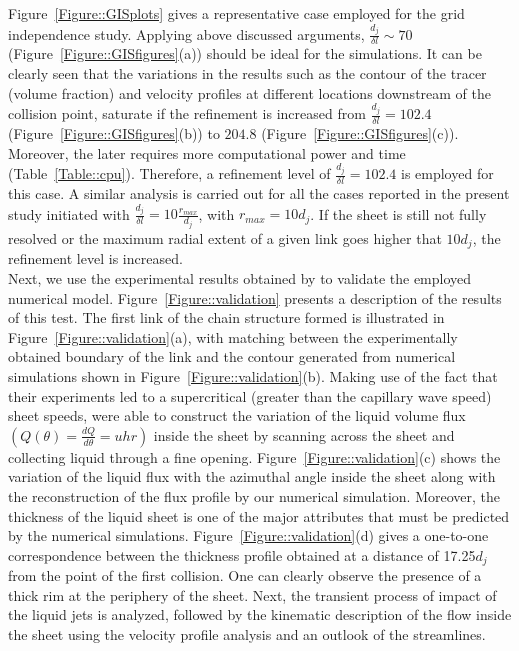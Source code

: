 \documentclass[%
aip,
sd,%
amsmath,amssymb,
preprint,%
author-year,%
]{revtex4-1}
\begin{document}
Figure~\ref{Figure::GISplots} gives a representative case employed for the grid independence study. Applying above discussed arguments, $\frac{d_j}{\delta l} \sim 70$ (Figure~\ref{Figure::GISfigures}(a)) should be ideal for the simulations. It can be  clearly seen that the variations in the results such as the contour of the tracer (volume fraction) and velocity profiles at different locations downstream of the collision point, saturate if the refinement is increased from $\frac{d_j}{\delta l} = 102.4$ (Figure~\ref{Figure::GISfigures}(b)) to $204.8$ (Figure~\ref{Figure::GISfigures}(c)). Moreover, the later requires more computational power and time (Table~\ref{Table::cpu}). Therefore, a refinement level of $\frac{d_j}{\delta l} = 102.4$ is employed for this case. A similar analysis is carried out for all the cases reported in the present study initiated with $\frac{d_j}{\delta l} = 10\frac{r_{max}}{d_j}$, with $r_{max} = 10d_j$. If the sheet is still not fully resolved or the maximum radial extent of a given link goes higher that $10d_j$, the refinement level is increased.\\
Next, we use the experimental results obtained by \cite{bush2004collision} to validate the employed numerical model. Figure~\ref{Figure::validation} presents a description of the results of this test. The first link of the chain structure formed is illustrated in Figure~\ref{Figure::validation}(a), with matching between the experimentally obtained boundary of the link and the contour generated from numerical simulations shown in Figure~\ref{Figure::validation}(b). Making use of the fact that their experiments led to a supercritical (greater than the capillary wave speed) sheet speeds, \cite{bush2004collision} were able to construct the variation of the liquid volume flux $\left(Q(\theta) = \frac{dQ}{d\theta} = uhr\right)$ inside the sheet by scanning across the sheet and collecting liquid through a fine opening. Figure~\ref{Figure::validation}(c) shows the variation of the liquid flux with the azimuthal angle inside the sheet along with the reconstruction of the flux profile by our numerical simulation. Moreover, the thickness of the liquid sheet is one of the major attributes that must be predicted by the numerical simulations. Figure~\ref{Figure::validation}(d) gives a one-to-one correspondence between the thickness profile obtained at a distance of 17.25$d_j$ from the point of the first collision. One can clearly observe the presence of a thick rim at the periphery of the sheet. Next, the transient process of impact of the liquid jets is analyzed, followed by the kinematic description of the flow inside the sheet using the velocity profile analysis and an outlook of the streamlines. 
\end{document}
